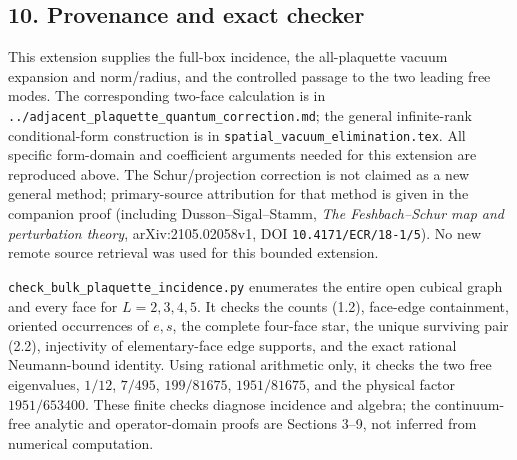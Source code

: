 \subsection{10. Provenance and exact
checker}\label{bulk-provenance-and-exact-checker}

This extension supplies the full-box incidence, the all-plaquette vacuum
expansion and norm/radius, and the controlled passage to the two leading
free modes. The corresponding two-face calculation is in
\texttt{../adjacent\_plaquette\_quantum\_correction.md}; the general
infinite-rank conditional-form construction is in
\texttt{spatial\_vacuum\_elimination.tex}. All specific form-domain and
coefficient arguments needed for this extension are reproduced above.
The Schur/projection correction is not claimed as a new general method;
primary-source attribution for that method is given in the companion
proof (including Dusson--Sigal--Stamm, \emph{The Feshbach--Schur map and
perturbation theory}, arXiv:2105.02058v1, DOI
\texttt{10.4171/ECR/18-1/5}). No new remote source retrieval was used
for this bounded extension.

\texttt{check\_bulk\_plaquette\_incidence.py} enumerates the entire open
cubical graph and every face for \(L=2,3,4,5\). It checks the counts
(1.2), face-edge containment, oriented occurrences of \(e,s\), the
complete four-face star, the unique surviving pair (2.2), injectivity of
elementary-face edge supports, and the exact rational Neumann-bound
identity. Using rational arithmetic only, it checks the two free
eigenvalues, \(1/12\), \(7/495\), \(199/81675\), \(1951/81675\), and the
physical factor \(1951/653400\). These finite checks diagnose incidence
and algebra; the continuum-free analytic and operator-domain proofs are
Sections 3--9, not inferred from numerical computation.
